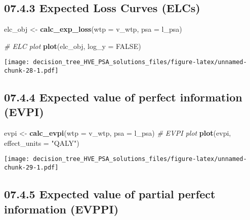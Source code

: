 \documentclass[
]{article}
\newenvironment{Shaded}{\begin{snugshade}}{\end{snugshade}}
\newcommand{\CommentTok}[1]{\textcolor[rgb]{0.56,0.35,0.01}{\textit{#1}}}
\newcommand{\DataTypeTok}[1]{\textcolor[rgb]{0.13,0.29,0.53}{#1}}
\newcommand{\KeywordTok}[1]{\textcolor[rgb]{0.13,0.29,0.53}{\textbf{#1}}}
\newcommand{\NormalTok}[1]{#1}
\newcommand{\OtherTok}[1]{\textcolor[rgb]{0.56,0.35,0.01}{#1}}
\newcommand{\StringTok}[1]{\textcolor[rgb]{0.31,0.60,0.02}{#1}}
\begin{document}
\hypertarget{expected-loss-curves-elcs}{%
\subsection{07.4.3 Expected Loss Curves
(ELCs)}\label{expected-loss-curves-elcs}}

\begin{Shaded}
\begin{Highlighting}[]
\NormalTok{elc_obj <-}\StringTok{ }\KeywordTok{calc_exp_loss}\NormalTok{(}\DataTypeTok{wtp =}\NormalTok{ v_wtp, }\DataTypeTok{psa =}\NormalTok{ l_psa)}

\CommentTok{# ELC plot}
\KeywordTok{plot}\NormalTok{(elc_obj, }\DataTypeTok{log_y =} \OtherTok{FALSE}\NormalTok{)}
\end{Highlighting}
\end{Shaded}

\texttt{[image: decision\_tree\_HVE\_PSA\_solutions\_files/figure-latex/unnamed-chunk-28-1.pdf]}

\hypertarget{expected-value-of-perfect-information-evpi}{%
\subsection{07.4.4 Expected value of perfect information
(EVPI)}\label{expected-value-of-perfect-information-evpi}}

\begin{Shaded}
\begin{Highlighting}[]
\NormalTok{evpi <-}\StringTok{ }\KeywordTok{calc_evpi}\NormalTok{(}\DataTypeTok{wtp =}\NormalTok{ v_wtp, }\DataTypeTok{psa =}\NormalTok{ l_psa)}
\CommentTok{# EVPI plot}
\KeywordTok{plot}\NormalTok{(evpi, }\DataTypeTok{effect_units =} \StringTok{"QALY"}\NormalTok{) }
\end{Highlighting}
\end{Shaded}

\texttt{[image: decision\_tree\_HVE\_PSA\_solutions\_files/figure-latex/unnamed-chunk-29-1.pdf]}

\hypertarget{expected-value-of-partial-perfect-information-evppi}{%
\subsection{07.4.5 Expected value of partial perfect information
(EVPPI)}\label{expected-value-of-partial-perfect-information-evppi}}
\end{document}
